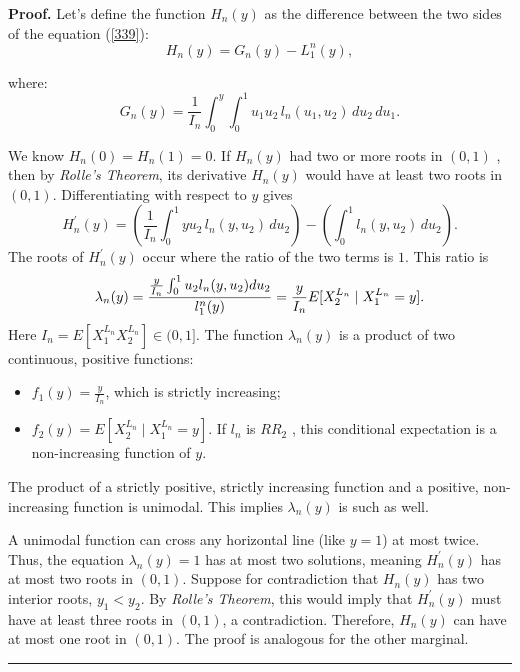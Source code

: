 \documentclass[onecolumn]{article}
\newenvironment{proof}[1][Proof]{\noindent\textbf{#1.} }{\ \rule{0.5em}{0.5em}}
\begin{document}
\begin{proof}
\vspace{0pt} Let's define the function $H_{n}(y)$ as the difference between
the two sides of the equation (\ref{339}):%
\begin{equation}
H_{n}(y)=G_{n}(y)-L_{1}^{n}(y),  \label{339a}
\end{equation}

where: 
\begin{equation}
G_{n}(y)=\frac{1}{I_{n}}\int_{0}^{y}\int_{0}^{1}u_{1}u_{2}%
\,l_{n}(u_{1},u_{2})\,du_{2}\,du_{1}.  \label{344}
\end{equation}

We know $H_{n}(0)=H_{n}(1)=0$. If $H_{n}(y)$ had two or more roots in $(0,1)$%
, then by \textit{Rolle's Theorem}, its derivative $H_{n}(y)$ would have at
least two roots in $(0,1)$. Differentiating with respect to $y$ gives 
\begin{equation}
H_{n}^{\prime }(y)=\left( \frac{1}{I_{n}}\int_{0}^{1}yu_{2}\,l_{n}(y,u_{2})%
\,du_{2}\right) -\left( \int_{0}^{1}l_{n}(y,u_{2})\,du_{2}\right) .
\label{340}
\end{equation}%
The roots of $H_{n}^{\prime }(y)$ occur where the ratio of the two terms is $%
1$. This ratio is 
\begin{equation}
\lambda _{n}(y)=\frac{\frac{y}{I_{n}}\int_{0}^{1}u_{2}l_{n}(y,u_{2})du_{2}}{%
l_{1}^{n}(y)}=\frac{y}{I_{n}}E[X_{2}^{L_{n}}\mid X_{1}^{L_{n}}=y].
\label{341}
\end{equation}%
Here $I_{n}=E[X_{1}^{L_{n}}X_{2}^{L_{n}}]\in (0,1]$. The function $\lambda
_{n}(y)$ is a product of two continuous, positive functions:

\begin{itemize}
\item $f_{1}(y)=\frac{y}{I_{n}}$, which is strictly increasing;

\item $f_{2}(y)=E[X_{2}^{L_{n}}\mid X_{1}^{L_{n}}=y]$. If $l_{n}$ is $RR_{2}$%
, this conditional expectation is a non-increasing function of $y$.
\end{itemize}

The product of a strictly positive, strictly increasing function and a
positive, non-increasing function is unimodal. This implies $\lambda _{n}(y)$
is such as well.

A unimodal function can cross any horizontal line (like $y=1$) at most
twice. Thus, the equation $\lambda _{n}(y)=1$ has at most two solutions,
meaning $H_{n}^{\prime }(y)$ has at most two roots in $(0,1)$. Suppose for
contradiction that $H_{n}(y)$ has two interior roots, $y_{1}<y_{2}$. By 
\textit{Rolle's Theorem}, this would imply that $H_{n}^{\prime }(y)$ must
have at least three roots in $(0,1)$, a contradiction. Therefore, $H_{n}(y)$
can have at most one root in $(0,1)$. The proof is analogous for the other
marginal.
\end{proof}
\end{document}
